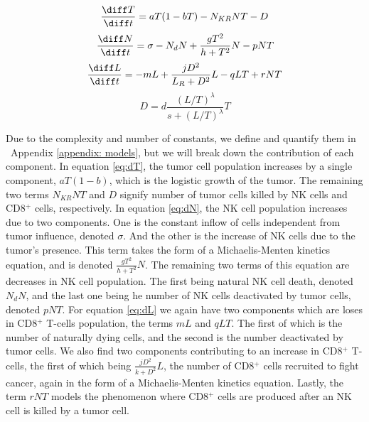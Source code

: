 \documentclass[11pt]{amsart}
\begin{document}
\begin{equation} 
	\frac{\diff T}{\diff t} = aT(1-bT) - N_{KR}NT - D \label{eq:dT}
\end{equation}
\begin{equation} \label{eq:dN}
	\frac{\diff N}{\diff t} = \sigma - N_dN +\frac{gT^2}{h + T^2}N - pNT
\end{equation}
\begin{equation} \label{eq:dL}
	\frac{\diff L}{\diff t} = - mL +\frac{jD^2}{L_R + D^2}L - qLT + rNT
\end{equation}
\begin{equation} \label{eq: D}
	D = d\frac{(L/T)^\lambda}{s + (L/T)^\lambda}T
\end{equation}

Due to the complexity and number of constants, we define and quantify them in \ Appendix \ref{appendix: models}, but we will break down the contribution of each component. 
In equation \eqref{eq:dT}, the tumor cell population increases by a single component, $aT(1-b)$, which is the logistic growth  of the tumor. The remaining two terms $N_{KR}NT$ and $D$ signify number of  tumor cells killed by NK cells and CD8$^+$ cells, respectively.
In equation \eqref{eq:dN}, the NK cell population increases due to two components. One is the constant inflow of cells independent from tumor influence, denoted $\sigma$. And the other is the increase of NK cells due to the tumor's presence. This term takes the form of a Michaelis-Menten kinetics equation, and is denoted $\frac{gT^2}{h + T^2}N$. The remaining two terms of this equation are decreases in NK cell population. The first being natural NK cell death, denoted $N_dN$, and the last one being he number of NK cells deactivated by tumor cells, denoted $pNT$.
For equation \eqref{eq:dL} we again have two components which are loses in CD8$^+$ T-cells population, the terms $mL$ and $qLT$. The first of which is the number of naturally dying cells, and the second is the number deactivated by tumor cells. We also find two components contributing to an increase in CD8$^+$ T-cells, the first of which being $\frac{jD^2}{k + D^2}L$, the number of CD8$^+$ cells recruited to fight cancer, again in the form of a Michaelis-Menten kinetics equation. Lastly, the term $rNT$ models the phenomenon where CD8$^+$ cells are produced after an NK cell is killed by a tumor cell. 
\end{document}
